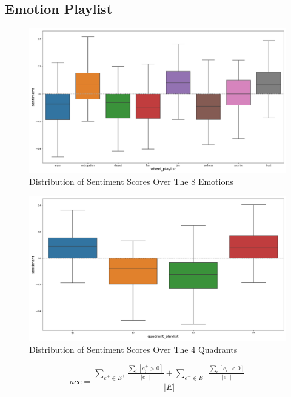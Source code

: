 \documentclass[11pt]{article}
\begin{document}
\subsection{Emotion Playlist}

\begin{figure}[!ht]
  \includegraphics[scale=0.42]{../statics/plots/wheel_playlist.png}
  \centering
  \caption{Distribution of Sentiment Scores Over The 8 Emotions}
  \label{fig:wheel_playlist}
\end{figure}

\begin{figure}[!ht]
  \includegraphics[scale=0.42]{../statics/plots/quadrant_playlist.png}
  \centering
  \caption{Distribution of Sentiment Scores Over The 4 Quadrants}
  \label{fig:quad_playlist}
\end{figure}

\begin{equation}
  acc = \frac{\sum_{e^{+} \in E^{+}}\frac{\sum_{i}[e^{+}_i > 0]}{|e^{+}|} + \sum_{e^{-} \in E^{-}}\frac{\sum_{i}[e^{-}_i < 0]}{|e^{-}|}}{|E|}
\end{equation}
\end{document}
